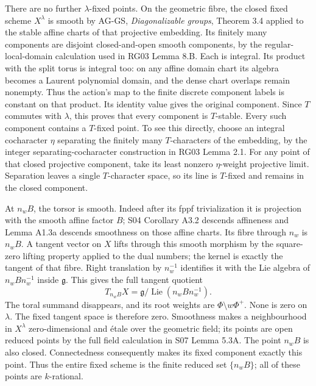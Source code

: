\documentclass[11pt,a4paper,openany]{report}
\newcounter{none}
\begin{document}
There are no further \(\lambda\)-fixed points. On the geometric fibre, the closed fixed scheme \(X^\lambda\) is smooth by AG-GS, \emph{Diagonalizable groups}, Theorem 3.4 applied to the stable affine charts of that projective embedding. Its finitely many components are disjoint closed-and-open smooth components, by the regular-local-domain calculation used in RG03 Lemma 8.B. Each is integral. Its product with the split torus is integral too: on any affine domain chart its algebra becomes a Laurent polynomial domain, and the dense chart overlaps remain nonempty. Thus the action's map to the finite discrete component labels is constant on that product. Its identity value gives the original component. Since \(T\) commutes with \(\lambda\), this proves that every component is \(T\)-stable. Every such component contains a \(T\)-fixed point. To see this directly, choose an integral cocharacter \(\eta\) separating the finitely many \(T\)-characters of the embedding, by the integer separating-cocharacter construction in RG03 Lemma 2.1. For any point of that closed projective component, take its least nonzero \(\eta\)-weight projective limit. Separation leaves a single \(T\)-character space, so its line is \(T\)-fixed and remains in the closed component.

At \(n_wB\), the torsor is smooth. Indeed after its fppf trivialization it is projection with the smooth affine factor \(B\); S04 Corollary A3.2 descends affineness and Lemma A1.3a descends smoothness on those affine charts. Its fibre through \(n_w\) is \(n_wB\). A tangent vector on \(X\) lifts through this smooth morphism by the square-zero lifting property applied to the dual numbers; the kernel is exactly the tangent of that fibre. Right translation by \(n_w^{-1}\) identifies it with the Lie algebra of \(n_wBn_w^{-1}\) inside \(\mathfrak g\). This gives the full tangent quotient \[
 T_{n_wB}X=\mathfrak g/
                \operatorname{Lie}(n_wBn_w^{-1}).
\] The toral summand disappears, and its root weights are \(\Phi\setminus w\Phi^+\). None is zero on \(\lambda\). The fixed tangent space is therefore zero. Smoothness makes a neighbourhood in \(X^\lambda\) zero-dimensional and étale over the geometric field; its points are open reduced points by the full field calculation in S07 Lemma 5.3A. The point \(n_wB\) is also closed. Connectedness consequently makes its fixed component exactly this point. Thus the entire fixed scheme is the finite reduced set \(\{n_wB\}\); all of these points are \(k\)-rational.
\end{document}

